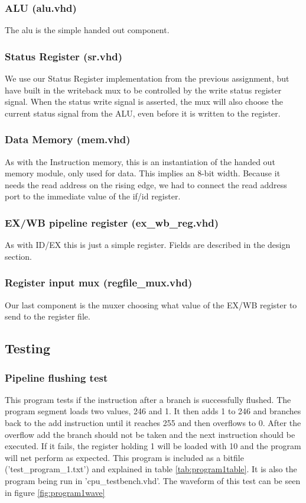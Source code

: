 \documentclass[11pt]{report}
\begin{document}
\subsubsection*{ALU (alu.vhd)}
The alu is the simple handed out component.
\subsubsection*{Status Register (sr.vhd)}
We use our Status Register implementation from the previous assignment, but have
built in the writeback mux to be controlled by the write status register signal.
When the status write signal is asserted, the mux will also choose the current 
status signal from the ALU, even before it is written to the register.
\subsubsection*{Data Memory (mem.vhd)}
As with the Instruction memory, this is an instantiation of the handed out memory
module, only used for data. This implies an 8-bit width. Because it needs the read address
on the rising edge, we had to connect the read address port to the immediate value of the
if/id register.
\subsubsection*{EX/WB pipeline register (ex_wb_reg.vhd)}
As with ID/EX this is just a simple register. Fields are described in the design section.
\subsubsection*{Register input mux (regfile_mux.vhd)}
Our last component is the muxer choosing what value of the EX/WB register to send to the
register file. 


\subsection*{Testing}

\subsubsection*{Pipeline flushing test}

This program tests if the instruction after a branch is successfully flushed.
The program segment loads two values, 246 and 1. It then adds 1 to 246 and
branches back to the add instruction until it reaches 255 and then overflows
to 0. After the overflow add the branch should not be taken and the next instruction
should be executed. If it fails, the register holding 1 will be loaded with 10
and the program will net perform as expected. This program is included as a bitfile
('test\_program\_1.txt') and explained in table \ref{tab:program1table}. It is also the 
program being run in 'cpu\_testbench.vhd'.
The waveform of this test can be seen in figure \ref{fig:program1wave}
\end{document}
